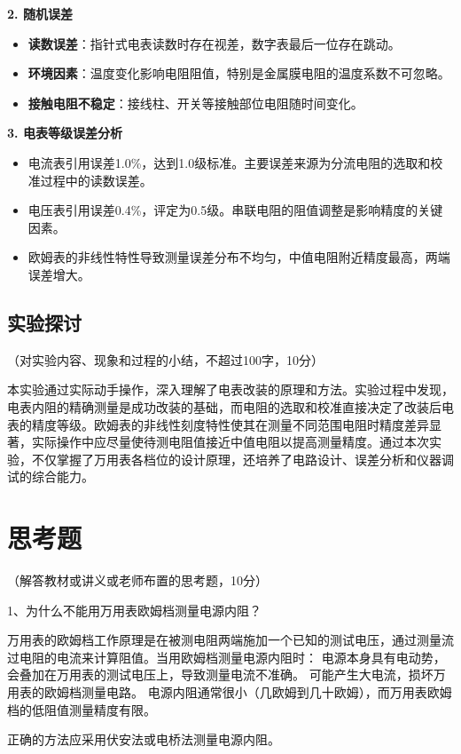 \documentclass[10pt,a4paper]{ctexart}
\newcommand{\xiaosi}{\fontsize{12pt}{16pt}\selectfont}
\begin{document}
\textbf{2. 随机误差}
\begin{itemize}
    \item \textbf{读数误差}：指针式电表读数时存在视差，数字表最后一位存在跳动。
    \item \textbf{环境因素}：温度变化影响电阻阻值，特别是金属膜电阻的温度系数不可忽略。
    \item \textbf{接触电阻不稳定}：接线柱、开关等接触部位电阻随时间变化。
\end{itemize}

\textbf{3. 电表等级误差分析}
\begin{itemize}
    \item 电流表引用误差1.0\%，达到1.0级标准。主要误差来源为分流电阻的选取和校准过程中的读数误差。
    \item 电压表引用误差0.4\%，评定为0.5级。串联电阻的阻值调整是影响精度的关键因素。
    \item 欧姆表的非线性特性导致测量误差分布不均匀，中值电阻附近精度最高，两端误差增大。
\end{itemize}

    \subsection{实验探讨}
    \xiaosi （对实验内容、现象和过程的小结，不超过100字，10分）

    本实验通过实际动手操作，深入理解了电表改装的原理和方法。实验过程中发现，电表内阻的精确测量是成功改装的基础，而电阻的选取和校准直接决定了改装后电表的精度等级。欧姆表的非线性刻度特性使其在测量不同范围电阻时精度差异显著，实际操作中应尽量使待测电阻值接近中值电阻以提高测量精度。通过本次实验，不仅掌握了万用表各档位的设计原理，还培养了电路设计、误差分析和仪器调试的综合能力。

\section{思考题}

    \xiaosi （解答教材或讲义或老师布置的思考题，10分）
    
1、为什么不能用万用表欧姆档测量电源内阻？

万用表的欧姆档工作原理是在被测电阻两端施加一个已知的测试电压，通过测量流过电阻的电流来计算阻值。当用欧姆档测量电源内阻时：
电源本身具有电动势，会叠加在万用表的测试电压上，导致测量电流不准确。
可能产生大电流，损坏万用表的欧姆档测量电路。
电源内阻通常很小（几欧姆到几十欧姆），而万用表欧姆档的低阻值测量精度有限。

正确的方法应采用伏安法或电桥法测量电源内阻。
\end{document}
